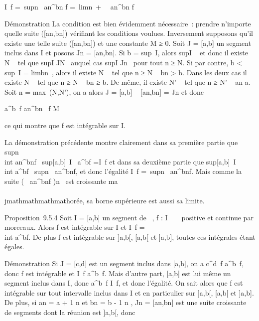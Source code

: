 \int  I~f =\
supn\int ~
an^bn f =\
limn\rightarrow~+\infty~\int ~
an^bn f

Démonstration La condition est bien évidemment nécessaire~: prendre
n'importe quelle suite ({[}an,bn{]}) vérifiant les
conditions voulues. Inversement supposons qu'il existe une telle suite
({[}an,bn{]}) et une constante M ≥ 0. Soit J =
{[}a,b{]} un segment inclus dans I et posons Jn =
{[}an,bn{]}. Si b = sup~I,
alors supI \in\cupJn~ et donc il existe N
\in \mathbb{N}~ tel que supI \in JN~ auquel cas
supI \in Jn~ pour tout n ≥ N. Si par
contre, b \textless{} sup~I
= limbn~, alors il existe N \in {}~ tel
que n ≥ N \rigtharrow~ bn \textgreater{} b. Dans les deux cas il existe N
\in {}~ tel que n ≥ N \rigtharrow~ bn ≥ b. De même, il existe N' \in \mathbb{N}~ tel que
n ≥ N' \rigtharrow~ an \leq a. Soit n = max~(N,N'),
on a alors J = {[}a,b{]} \subset~ {[}an,bn{]} =
Jn et donc

\int  a^b~f
\leq\int  an^bn~
f \leq M

ce qui montre que f est intégrable sur I.

La démonstration précédente montre clairement dans sa première partie
que supn~\\int
 an^bnf \leq\
sup{[}a,b{]}\subset~I\int ~
a^bf =\int  I~f et dans
sa deuxième partie que
sup{[}a,b{]}\subset~I~\\int
 a^bf \leq\
supn\int ~
an^bnf, et donc l'égalité
\int  I~f =\
supn\int ~
an^bnf. Mais comme la suite
\left (\int ~
an^bnf\right
)n\in{}~ est croissante ma\\\\jmathmathmathmathorée, sa borne supérieure est aussi sa
limite.

Proposition~9.5.4 Soit I = {[}a,b{]} un segment de ~, f : I \rightarrow~ ~ positive
et continue par morceaux. Alors f est intégrable sur I et
\int  I~f =\\int
 a^bf. De plus f est intégrable sur {]}a,b{[},
{[}a,b{[} et {]}a,b{]}, toutes ces intégrales étant égales.

Démonstration Si J = {[}c,d{]} est un segment inclus dans {[}a,b{]}, on
a \int  c^d~f
\leq\int  a^b~f, donc f est
intégrable et \int  I~f
\leq\int  a^b~f. Mais d'autre part,
{[}a,b{]} est lui même un segment inclus dans I, donc
\int  a^b~f
\leq\int  I~f, et donc l'égalité. On sait
alors que f est intégrable sur tout intervalle inclus dans I et en
particulier sur {]}a,b{[}, {[}a,b{[} et {]}a,b{]}. De plus, si
an = a + 1 \over n et bn = b -
1 \over n , Jn =
{[}an,bn{]} est une suite croissante de segments
dont la réunion est {]}a,b{[}, donc

